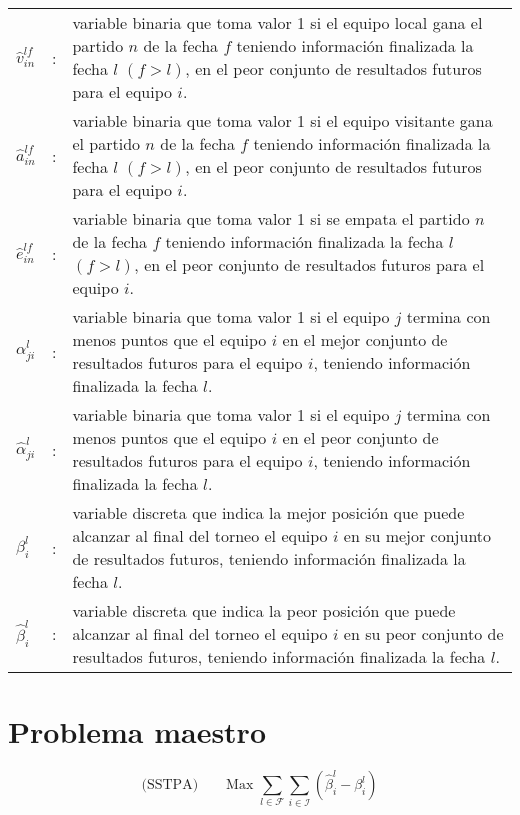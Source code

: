 \documentclass[authoryear,preprint,review,12pts]{elsarticle}
\begin{document}
\begin{tabular}{p{0.79cm}cp{13.5cm}}
$\hat{v}_{in}^{lf}$  & : & variable binaria que toma valor 1 si el equipo local gana el partido $n$ de la fecha $f$ teniendo información finalizada la fecha $l$ $(f > l)$, en el peor conjunto de resultados futuros para el equipo $i$.\\
$\hat{a}_{in}^{lf}$  & : & variable binaria que toma valor 1 si el equipo visitante gana el partido $n$ de la fecha $f$ teniendo información finalizada la fecha $l$ $(f > l)$, en el peor conjunto de resultados futuros para el equipo $i$.\\
$\hat{e}_{in}^{lf}$  & : & variable binaria que toma valor 1 si se empata el partido $n$ de la fecha $f$ teniendo información finalizada la fecha $l$ $(f > l)$, en el peor conjunto de resultados futuros para el equipo $i$.\\
$\alpha_{ji}^l$  & : & variable binaria que toma valor 1 si el equipo $j$ termina con menos puntos que el equipo $i$ en el mejor conjunto de resultados futuros para el equipo $i$, teniendo información finalizada la fecha $l$.\\
$\hat{\alpha}_{ji}^l$  & : & variable binaria que toma valor 1 si el equipo $j$ termina con menos puntos que el equipo $i$ en el peor conjunto de resultados futuros para el equipo $i$, teniendo información finalizada la fecha $l$.\\
$\beta_{i}^l$  & : & variable discreta que indica la mejor posición que puede alcanzar al final del torneo el equipo $i$ en su mejor conjunto de resultados futuros, teniendo información finalizada la fecha $l$.\\
$\hat{\beta}_{i}^l$  & : & variable discreta que indica la peor posición que puede alcanzar al final del torneo el equipo $i$ en su peor conjunto de resultados futuros, teniendo información finalizada la fecha $l$.\\
\end{tabular}


\newpage
\section{Problema maestro}
\begin{equation}\label{ecFO}
  \mbox{(SSTPA)}\qquad \text{Max } \sum_{l \in \mathcal{F}} \sum_{i \in \mathcal{I}}\left(\hat{\beta}_i^l - \beta_i^l\right)
\end{equation}
\end{document}
